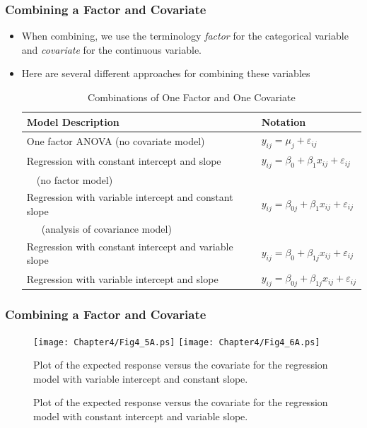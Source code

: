 \begin{frame}%
\frametitle{Combining a Factor and Covariate}
\begin{itemize}
\item When combining, we use the
terminology \emph{factor} for the categorical variable and
\emph{covariate} for the continuous variable.
\item Here are several different approaches for combining these
variables

\begin{table}[h] \caption{Combinations of One Factor and One Covariate}
\begin{tabular}{ll}
\hline Model Description & Notation \\ \hline One factor ANOVA (no
covariate model) &
$y_{ij}=\mu _{j}+\varepsilon_{ij}$ \\
Regression with constant intercept and slope  & $y_{ij}=\beta _{0}+\beta _{1}x_{ij}+\varepsilon_{ij}$ \\
~~(no factor model) \\
Regression with variable intercept and constant slope &
$y_{ij}=\beta _{0j}+\beta _{1}x_{ij}+\varepsilon_{ij}$ \\
~~~(analysis of covariance model) &  \\
Regression with constant intercept and variable slope &
$y_{ij}=\beta _{0}+\beta _{1j}x_{ij}+\varepsilon_{ij}$ \\
Regression with variable intercept and slope &
$y_{ij}=\beta _{0j}+\beta _{1j}x_{ij}+\varepsilon_{ij}$ \\
\hline
\end{tabular}
\end{table}
\end{itemize}
\end{frame}



\begin{frame}%
\frametitle{Combining a Factor and Covariate}
\begin{figure}[htp]
  \begin{center}
    \texttt{[image: Chapter4/Fig4\_5A.ps]}
    \texttt{[image: Chapter4/Fig4\_6A.ps]} \hfill
     \parbox[t]{2in}{\caption{ \tiny  Plot of the expected response versus the covariate for the regression model
with variable intercept and constant slope.}} \hfill
    \parbox[t]{2in}{\caption{ \tiny  Plot of the expected response versus the covariate for the regression model
with constant intercept and variable slope.}}
  \end{center}
\end{figure}
\end{frame}

